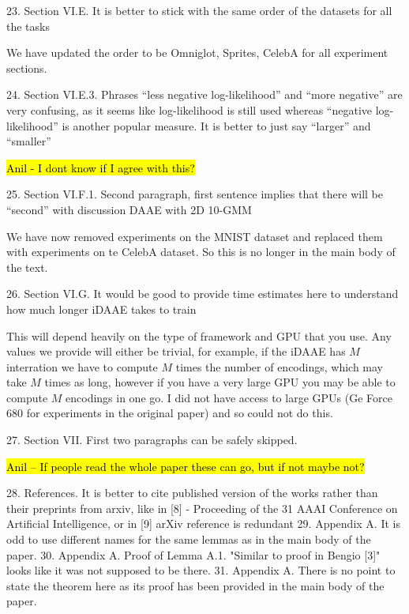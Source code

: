 \documentclass{article}
\begin{document}
{\color{blue}
23. Section VI.E. It is better to stick with the same order of the datasets for all the tasks
}

{\color{red} We have updated the order to be Omniglot, Sprites, CelebA for all experiment sections.}

{\color{blue}
24. Section VI.E.3. Phrases ``less negative log-likelihood'' and ``more negative'' are very confusing, as it seems like log-likelihood is still used whereas ``negative log-likelihood'' is another popular measure. It is better to just say ``larger'' and ``smaller''
}

\hl{Anil - I dont know if I agree with this?}


{\color{blue}
25. Section VI.F.1. Second paragraph, first sentence implies that there will be ``second'' with discussion DAAE with 2D 10-GMM
}

{\color{red} We have now removed experiments on the MNIST dataset and replaced them with experiments on te CelebA dataset. So this is no longer in the main body of the text.}

{\color{blue}
26. Section VI.G. It would be good to provide time estimates here to understand how much longer iDAAE takes to train
}

{\color{red} This will depend heavily on the type of framework and GPU that you use. Any values we provide will either be trivial, for example, if the iDAAE has $M$ interration we have to compute $M$ times the number of encodings, which may take $M$ times as long, however if you have a very large GPU you may be able to compute $M$ encodings in one go. I did not have access to large GPUs (Ge Force 680 for experiments in the original paper) and so could not do this.}

{\color{blue}
27. Section VII. First two paragraphs can be safely skipped.
}

\hl{Anil -- If people read the whole paper these can go, but if not maybe not?}

28. References. It is better to cite published version of the works rather than their preprints from arxiv, like in [8] - Proceeding of the 31 AAAI Conference on Artificial Intelligence, or in [9] arXiv reference is redundant
29. Appendix A. It is odd to use different names for the same lemmas as in the main body of the paper.
30. Appendix A. Proof of Lemma A.1. "Similar to proof in Bengio [3]" looks like it was not supposed to be there.
31. Appendix A. There is no point to state the theorem here as its proof has been provided in the main body of the paper. 
\end{document}
